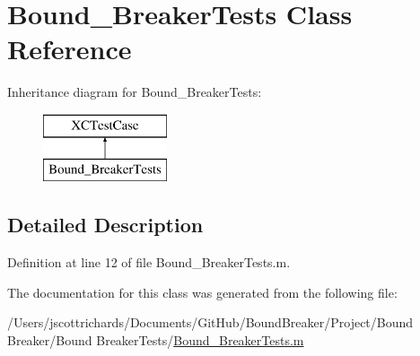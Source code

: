 \hypertarget{interface_bound___breaker_tests}{}\section{Bound\+\_\+\+Breaker\+Tests Class Reference}
\label{interface_bound___breaker_tests}
Inheritance diagram for Bound\+\_\+\+Breaker\+Tests\+:\begin{figure}[H]
\begin{center}
\leavevmode
\includegraphics[height=2.000000cm]{interface_bound___breaker_tests}
\end{center}
\end{figure}


\subsection{Detailed Description}


Definition at line 12 of file Bound\+\_\+\+Breaker\+Tests.\+m.



The documentation for this class was generated from the following file\+:\begin{DoxyCompactItemize}
\item 
/\+Users/jscottrichards/\+Documents/\+Git\+Hub/\+Bound\+Breaker/\+Project/\+Bound Breaker/\+Bound Breaker\+Tests/\hyperlink{_bound___breaker_tests_8m}{Bound\+\_\+\+Breaker\+Tests.\+m}\end{DoxyCompactItemize}
